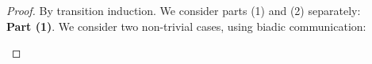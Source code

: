 \begin{proof}
By transition induction.
We consider parts (1) and (2) separately: \\
\noi \textbf{Part (1)}. We consider two non-trivial cases, using biadic communication:
\begin{enumerate}[1.]


\end{enumerate}
\end{proof}
